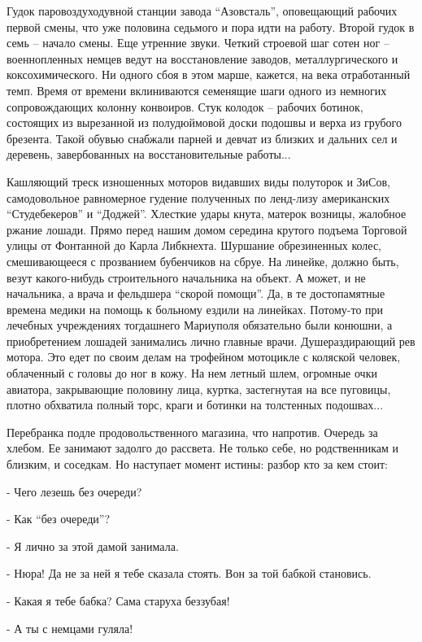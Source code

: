 Гудок паровоздуходувной станции завода \enquote{Азовсталь},  оповещающий рабочих первой
смены, что уже половина седьмого и пора идти на работу. Второй гудок в семь –
начало смены. Еще утренние звуки. Четкий строевой шаг сотен ног – военнопленных
немцев ведут на восстановление заводов, металлургического и коксохимического.
Ни одного сбоя в этом марше, кажется, на века отработанный темп. Время от
времени вклиниваются семенящие шаги одного из немногих сопровождающих колонну
конвоиров. Стук колодок – рабочих ботинок, состоящих из вырезанной из
полудюймовой доски подошвы и верха из грубого брезента. Такой обувью снабжали
парней и девчат из близких и дальних сел и деревень, завербованных на
восстановительные работы...

Кашляющий треск изношенных моторов видавших виды полуторок и ЗиСов,
самодовольное равномерное гудение полученных по ленд-лизу американских
\enquote{Студебекеров} и \enquote{Доджей}. Хлесткие удары кнута, матерок возницы, жалобное
ржание лошади. Прямо перед нашим домом середина крутого подъема Торговой улицы
от Фонтанной до Карла Либкнехта. Шуршание обрезиненных колес, смешивающееся с
прозванием бубенчиков на сбруе. На линейке, должно быть, везут какого-нибудь
строительного начальника на объект. А может, и не начальника, а врача и
фельдшера \enquote{скорой помощи}. Да, в те достопамятные времена медики на помощь к
больному ездили на линейках. Потому-то при лечебных учреждениях тогдашнего
Мариуполя обязательно были конюшни, а приобретением лошадей занимались лично
главные врачи. Душераздирающий рев мотора. Это едет по своим делам на трофейном
мотоцикле с коляской человек, облаченный с головы до ног в кожу. На нем летный
шлем, огромные очки авиатора, закрывающие половину лица, куртка, застегнутая на
все пуговицы, плотно обхватила полный торс, краги и ботинки на толстенных
подошвах...

Перебранка подле продовольственного магазина, что напротив. Очередь за хлебом.
Ее занимают задолго до рассвета. Не только себе, но родственникам и близким, и
соседкам. Но наступает момент истины: разбор кто за кем стоит: 

- Чего  лезешь без очереди?

- Как \enquote{без очереди}?

- Я лично за этой дамой занимала.

- Нюра! Да не за ней я тебе сказала стоять. Вон за той бабкой становись.

- Какая я тебе бабка? Сама старуха беззубая!

- А ты с немцами гуляла!

